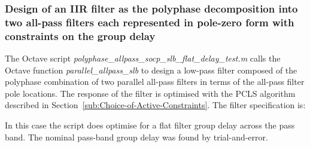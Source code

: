 \documentclass[a4paper,twoside,10pt,english]{report}
\begin{document}
\subsubsection{Design of an IIR filter as the polyphase decomposition into two all-pass filters each represented in pole-zero form with constraints on the group delay}
The Octave script \emph{polyphase\_allpass\_socp\_slb\_flat\_delay\_test.m} 
calls the Octave function \emph{parallel\_allpass\_slb}
to design a low-pass filter composed of the polyphase combination of two parallel
all-pass filters in terms of the all-pass filter 
pole locations. The response of the filter is optimised with the PCLS algorithm
described in Section~\ref{sub:Choice-of-Active-Constraints}. The filter
specification is:
\begin{small}

\end{small}
In this case the script does optimise for a flat filter group delay across the
pass band. The nominal pass-band group delay was found by trial-and-error.
\end{document}
